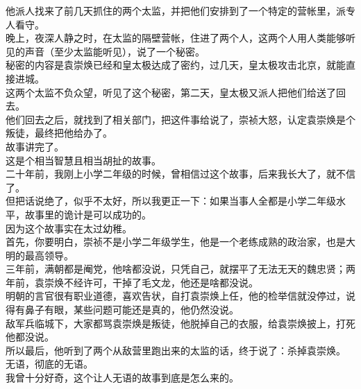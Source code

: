 \begin{multicols}{\theparacolNo}
他派人找来了前几天抓住的两个太监，并把他们安排到了一个特定的营帐里，派专人看守。\\

晚上，夜深人静之时，在太监的隔壁营帐，住进了两个人，这两个人用人类能够听见的声音（至少太监能听见），说了一个秘密。\\

秘密的内容是袁崇焕已经和皇太极达成了密约，过几天，皇太极攻击北京，就能直接进城。\\

这两个太监不负众望，听见了这个秘密，第二天，皇太极又派人把他们给送了回去。\\

他们回去之后，就找到了相关部门，把这件事给说了，崇祯大怒，认定袁崇焕是个叛徒，最终把他给办了。\\

故事讲完了。\\

这是个相当智慧且相当胡扯的故事。\\

二十年前，我刚上小学二年级的时候，曾相信过这个故事，后来我长大了，就不信了。\\

但把话说绝了，似乎不太好，所以我更正一下：如果当事人全都是小学二年级水平，故事里的诡计是可以成功的。\\

因为这个故事实在太过幼稚。\\

首先，你要明白，崇祯不是小学二年级学生，他是一个老练成熟的政治家，也是大明的最高领导。\\

三年前，满朝都是阉党，他啥都没说，只凭自己，就摆平了无法无天的魏忠贤；两年前，袁崇焕不经许可，干掉了毛文龙，他还是啥都没说。\\

明朝的言官很有职业道德，喜欢告状，自打袁崇焕上任，他的检举信就没停过，说得有鼻子有眼，某些问题可能还是真的，他仍然没说。\\

敌军兵临城下，大家都骂袁崇焕是叛徒，他脱掉自己的衣服，给袁崇焕披上，打死他都没说。\\

所以最后，他听到了两个从敌营里跑出来的太监的话，终于说了：杀掉袁崇焕。\\

无语，彻底的无语。\\

我曾十分好奇，这个让人无语的故事到底是怎么来的。\\


\end{multicols}
